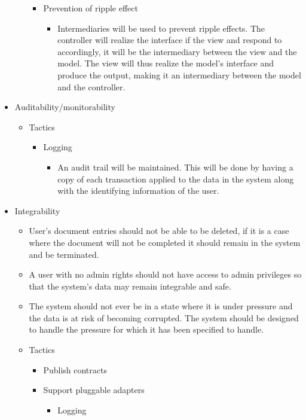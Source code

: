 \documentclass[a4paper,12pt]{article}
\begin{document}
\begin{itemize}
\begin{itemize}
\begin{itemize}
				\item Prevention of ripple effect 
				
					\begin{itemize}
						\item Intermediaries will be used to prevent ripple effects. The controller will realize the interface if the view and respond to accordingly, it will be the intermediary between the view and the model. The view will thus realize the model's interface and produce the output, making it an intermediary between the model and the controller.
					\end{itemize}

			\end{itemize}			
			
		\end{itemize}
		\item Auditability/monitorability
		\begin{itemize}
			
			\item Tactics
			\begin{itemize}
				\item Logging
					\begin{itemize}
						\item An audit trail will be maintained. This will be done by having a copy of each transaction applied to the data in the system along with the identifying information of the user.
					\end{itemize}					
			\end{itemize}			
			
		\end{itemize}
		\item Integrability
		\begin{itemize}
			\item User's document entries should not be able to be deleted, if it is a case where the document will not be completed it should remain in the system and be terminated.
			\item A user with no admin rights should not have access to admin privileges so that the system's data may remain integrable and safe.
			\item The system should not ever be in a state where it is under pressure and the data is at risk of becoming corrupted. The system should be designed to handle the pressure for which it has been specified to handle.
			
			\item Tactics
			\begin{itemize}
				\item Publish contracts
				\item Support pluggable adapters
					\begin{itemize}
						\item Logging
					\end{itemize}
			\end{itemize}			
		

\end{itemize}
\end{itemize}
\end{document}
